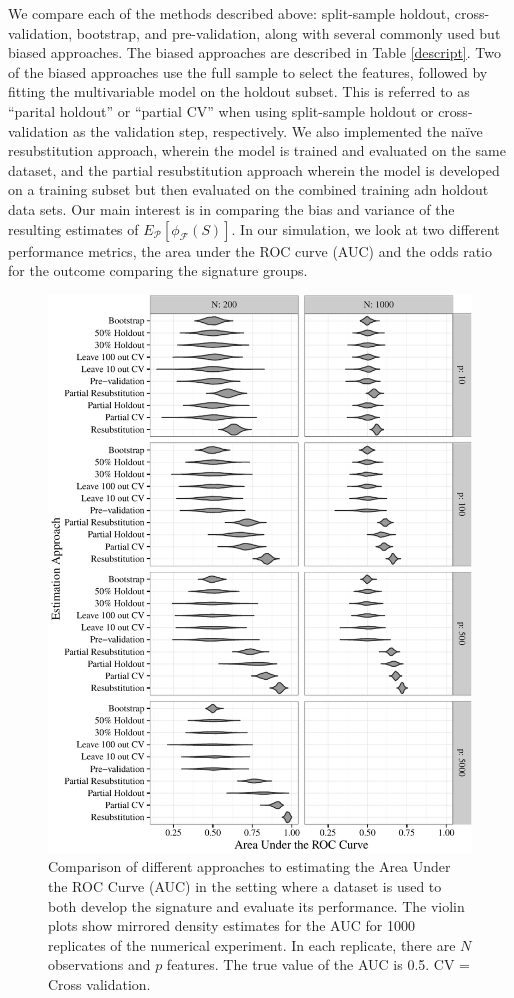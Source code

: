 \documentclass[11pt,]{article}
\begin{document}
We compare each of the methods described above: split-sample holdout,
cross-validation, bootstrap, and pre-validation, along with several
commonly used but biased approaches. The biased approaches are described
in Table \ref{descript}. Two of the biased approaches use the full
sample to select the features, followed by fitting the multivariable
model on the holdout subset. This is referred to as ``parital holdout''
or ``partial CV'' when using split-sample holdout or cross-validation as
the validation step, respectively. We also implemented the naïve
resubstitution approach, wherein the model is trained and evaluated on
the same dataset, and the partial resubstitution approach wherein the
model is developed on a training subset but then evaluated on the
combined training adn holdout data sets. Our main interest is in
comparing the bias and variance of the resulting estimates of
\(E_{\mathcal{P}}[\phi_{\mathcal{F}}(S)]\). In our simulation, we look
at two different performance metrics, the area under the ROC curve (AUC)
and the odds ratio for the outcome comparing the signature groups.

\begin{figure}[htbp]
\centering
\includegraphics{paper-revised-resub_files/figure-latex/cvsims-1.pdf}
\caption{Comparison of different approaches to estimating the Area Under
the ROC Curve (AUC) in the setting where a dataset is used to both
develop the signature and evaluate its performance. The violin plots
show mirrored density estimates for the AUC for 1000 replicates of the
numerical experiment. In each replicate, there are \(N\) observations
and \(p\) features. The true value of the AUC is 0.5. CV = Cross
validation. \label{fig1}}
\end{figure}
\end{document}
